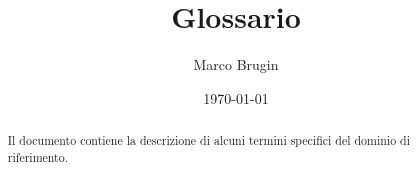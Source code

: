 \documentclass{article}
\title{Glossario}
\author{Marco Brugin}
\date{\today}
\begin{document}
\maketitle



\begin{abstract}
    

Il documento contiene la descrizione di alcuni termini specifici del dominio di riferimento.
\end{abstract}
\clearpage


\glsaddall{}
\printglossary[nonumberlist]
\end{document}
